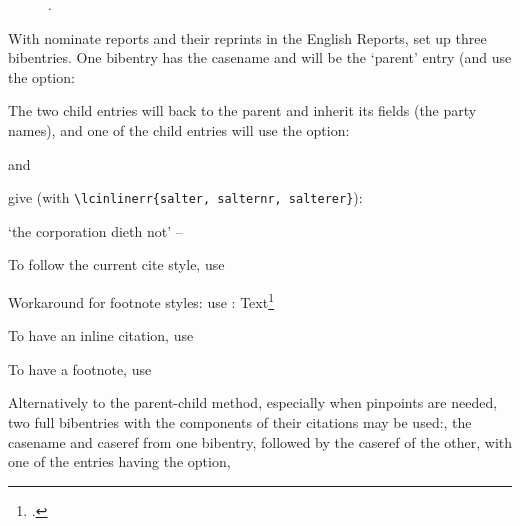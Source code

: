 \begin{figure}
\begin{center}
\toggletrue{lcimageshow}
\caption[Equity follows Law]{.}
\end{center}
\end{figure}

\p With nominate reports and their reprints in the English Reports, set up three bibentries.  One bibentry has the casename and will be the `parent' entry (and use the  option:


\begin{myquotation}\noindent
{}
\end{myquotation}

The two child entries will  back to the parent and inherit its fields (the party names), and one of the child entries will use the  option:

\begin{myquotation}\noindent
{}
\end{myquotation}

and

\begin{myquotation}\noindent
{}
\end{myquotation}
give (with \verb|\lcinlinerr{salter, salternr, salterer}|):
\begin{myquotation}\noindent
`the corporation dieth not' -- 
\end{myquotation}

\p To  follow the current cite style, use

Workaround for footnote styles: use : Text\footnote{.}

\p To have an inline citation, use


\p To have a footnote, use



\p Alternatively to the parent-child method, especially when pinpoints are needed, two full bibentries with the components of their citations may be used:, the casename and caseref from one bibentry, followed by the caseref of the other, with one of the entries having the  option,

